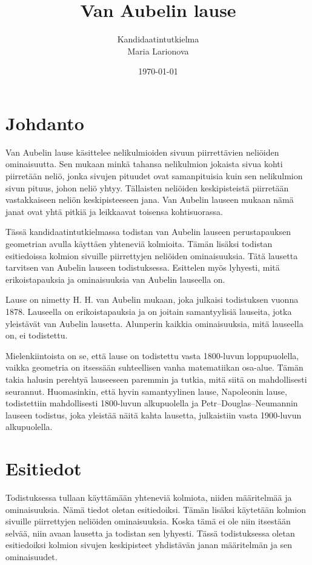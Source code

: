 \documentclass{scrartcl}
\title{Van Aubelin lause}
\author{Kandidaatintutkielma\\Maria Larionova}
\date{\today}
\begin{document}
\maketitle
\pagebreak
\tableofcontents
\pagebreak


\section{Johdanto}
Van Aubelin lause käsittelee nelikulmioiden sivuun piirrettävien neliöiden ominaisuutta. Sen mukaan minkä tahansa nelikulmion jokaista sivua kohti piirretään neliö, jonka sivujen pituudet ovat samanpituisia kuin sen nelikulmion sivun pituus, johon neliö yhtyy. Tällaisten neliöiden keskipisteistä piirretään vastakkaiseen neliön keskipisteeseen jana. Van Aubelin lauseen mukaan nämä janat ovat yhtä pitkiä ja leikkaavat toisensa kohtisuorassa. 

Tässä kandidaatintutkielmassa todistan van Aubelin lauseen perustapauksen geometrian avulla käyttäen yhteneviä kolmioita. Tämän lisäksi todistan esitiedoissa kolmion sivuille piirrettyjen neliöiden ominaisuuksia. Tätä lausetta tarvitsen van Aubelin lauseen todistuksessa. Esittelen myös lyhyesti, mitä erikoistapauksia ja ominaisuuksia van Aubelin lauseella on. 

Lause on nimetty H. H. van Aubelin mukaan, joka julkaisi todistuksen vuonna 1878. Lauseella on erikoistapauksia ja on joitain samantyylisiä lauseita, jotka yleistävät van Aubelin lausetta. Alunperin kaikkia ominaisuuksia, mitä lauseella on, ei todistettu.

Mielenkiintoista on se, että lause on todistettu vasta 1800-luvun loppupuolella, vaikka geometria on itsessään suhteellisen vanha matematiikan osa-alue. Tämän takia halusin perehtyä lauseeseen paremmin ja tutkia, mitä siitä on mahdollisesti seurannut. Huomasinkin, että hyvin samantyylinen lause, Napoleonin lause, todistettiin mahdollisesti 1800-luvun alkupuolella ja Petr–Douglas–Neumannin lauseen todistus, joka yleistää näitä kahta lausetta, julkaistiin vasta 1900-luvun alkupuolella.


\pagebreak
\section{Esitiedot}
Todistuksessa tullaan käyttämään yhteneviä kolmiota, niiden määritelmää ja ominaisuuksia. Nämä tiedot oletan esitiedoiksi. Tämän lisäksi käytetään kolmion sivuille piirrettyjen neliöiden ominaisuuksia. Koska tämä ei ole niin itsestään selvää, niin avaan lausetta ja todistan sen lyhyesti. Tässä todistuksessa oletan esitiedoiksi kolmion sivujen keskipisteet yhdistävän janan määritelmän ja sen ominaisuudet.
\end{document}
